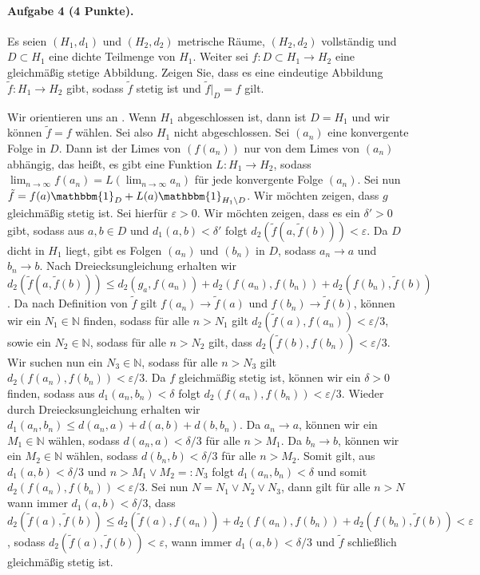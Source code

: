 \documentclass{article}
\begin{document}
\paragraph{Aufgabe 4 \textnormal{(4 Punkte)}.}
Es seien $(H_1,d_1)$ und $(H_2,d_2)$ metrische Räume, $(H_2,d_2)$ vollständig und $D\subset H_1$ eine dichte Teilmenge von $H_1$.
Weiter sei $f\colon D\subset H_1\to H_2$ eine gleichmäßig stetige Abbildung.
Zeigen Sie, dass es eine eindeutige Abbildung $\tilde{f}\colon H_1\to H_2$ gibt, sodass $\tilde{f}$ stetig ist und $\tilde{f}|_D=f$ gilt.

Wir orientieren uns an \cite{proofwiki1}.
Wenn $H_1$ abgeschlossen ist, dann ist $D=H_1$ und wir können $\tilde{f}=f$ wählen.
Sei also $H_1$ nicht abgeschlossen.
Sei $(a_n)$ eine konvergente Folge in $D$.
Dann ist der Limes von $(f(a_n))$ nur von dem Limes von $(a_n)$ abhängig, das heißt, es gibt eine Funktion $L\colon H_1\to H_2$, sodass $\lim_{n\to\infty}f(a_n)=L(\lim_{n\to\infty} a_n)$ für jede konvergente Folge $(a_n)$.
Sei nun $\tilde{f}=f(a)\mathbbm{1}_{D}+L(a)\mathbbm{1}_{H_1\setminus D}$.
Wir möchten zeigen, dass $g$ gleichmäßig stetig ist.
Sei hierfür $\varepsilon>0$.
Wir möchten zeigen, dass es ein $\delta'>0$ gibt, sodass aus $a,b\in D$ und $d_1(a,b)<\delta'$ folgt $d_2(\tilde{f}(a,\tilde{f}(b)))<\varepsilon$.
Da $D$ dicht in $H_1$ liegt, gibt es Folgen $(a_n)$ und $(b_n)$ in $D$, sodass $a_n\to a$ und $b_n\to b$.
Nach Dreiecksungleichung erhalten wir $d_2(\tilde{f}(a,\tilde{f}(b)))\leq d_2(g_a,f(a_n))+d_2(f(a_n),f(b_n))+d_2(f(b_n),\tilde{f}(b))$.
Da nach Definition von $\tilde{f}$ gilt $f(a_n)\to \tilde{f}(a)$ und $f(b_n)\to \tilde{f}(b)$, können wir ein $N_1\in\mathbb{N}$ finden, sodass für alle $n> N_1$ gilt $d_2(\tilde{f}(a),f(a_n))<\varepsilon/3$, sowie ein $N_2\in\mathbb{N}$, sodass für alle $n>N_2$ gilt, dass $d_2(\tilde{f}(b),f(b_n))<\varepsilon/3$.
Wir suchen nun ein $N_3\in\mathbb{N}$, sodass für alle $n>N_3$ gilt $d_2(f(a_n),f(b_n))<\varepsilon/3$.
Da $f$ gleichmäßig stetig ist, können wir ein $\delta>0$ finden, sodass aus $d_1(a_n,b_n)<\delta$ folgt $d_2(f(a_n),f(b_n))<\varepsilon/3$.
Wieder durch Dreiecksun\-gleic\-hung erhalten wir $d_1(a_n,b_n)\leq d(a_n,a)+d(a,b)+d(b,b_n)$.
Da $a_n\to a$, können wir ein $M_1\in\mathbb{N}$ wählen, sodass $d(a_n,a)<\delta/3$ für alle $n>M_1$.
Da $b_n\to b$, können wir ein $M_2\in\mathbb{N}$ wählen, sodass $d(b_n,b)<\delta/3$ für alle $n>M_2$.
Somit gilt, aus $d_1(a,b)<\delta/3$ und $n> M_1\vee M_2=:N_3$ folgt $d_1(a_n,b_n)<\delta$ und somit $d_2(f(a_n),f(b_n))<\varepsilon/3$.
Sei nun $N=N_1\vee N_2\vee N_3$, dann gilt für alle $n>N$ wann immer $d_1(a,b)<\delta/3$, dass $d_2(\tilde{f}(a),\tilde{f}(b))\leq d_2(\tilde{f}(a),f(a_n))+d_2(f(a_n),f(b_n))+d_2(f(b_n),\tilde{f}(b))<\varepsilon$, sodass $d_2(\tilde{f}(a),\tilde{f}(b))<\varepsilon$, wann immer $d_1(a,b)<\delta/3$ und $\tilde{f}$ schließlich gleichmäßig stetig ist.
\pagebreak
\end{document}
